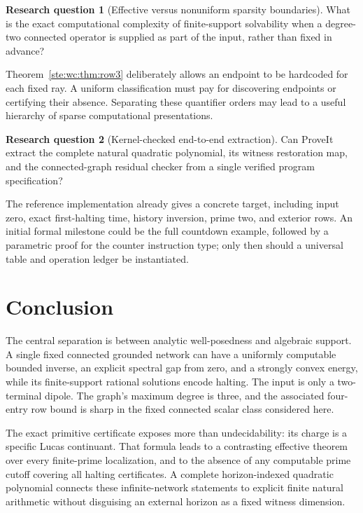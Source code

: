 \documentclass[11pt,letterpaper]{article}
\theoremstyle{definition}
\newtheorem{question}{Research question}
\theoremstyle{remark}
\begin{document}
\begin{question}[Effective versus nonuniform sparsity boundaries]\label{ste:wc:q:uniform}
What is the exact computational complexity of finite-support solvability
when a degree-two connected operator is supplied as part of the input,
rather than fixed in advance?
\end{question}
Theorem~\ref{ste:wc:thm:row3} deliberately allows an endpoint to be hardcoded for each
fixed ray. A uniform classification must pay for discovering endpoints or
certifying their absence. Separating these quantifier orders may lead to a
useful hierarchy of sparse computational presentations.

\begin{question}[Kernel-checked end-to-end extraction]\label{ste:wc:q:extraction}
Can ProveIt extract the complete natural quadratic polynomial, its witness
restoration map, and the connected-graph residual checker from a single
verified program specification?
\end{question}
The reference implementation already gives a concrete target, including
input zero, exact first-halting time, history inversion, prime two, and
exterior rows. An initial formal milestone could be the full countdown
example, followed by a parametric proof for the counter instruction type;
only then should a universal table and operation ledger be instantiated.

\section{Conclusion}
The central separation is between analytic well-posedness and algebraic
support. A single fixed connected grounded network can have a uniformly
computable bounded inverse, an explicit spectral gap from zero, and a
strongly convex energy, while its finite-support rational solutions encode
halting. The input is only a two-terminal dipole. The graph's maximum degree
is three, and the associated four-entry row bound is sharp in the fixed
connected scalar class considered here.

The exact primitive certificate exposes more than undecidability: its
charge is a specific Lucas continuant. That formula leads to a contrasting
effective theorem over every finite-prime localization, and to the absence
of any computable prime cutoff covering all halting certificates. A complete
horizon-indexed quadratic polynomial connects these infinite-network
statements to explicit finite natural arithmetic without disguising an
external horizon as a fixed witness dimension.
\end{document}
